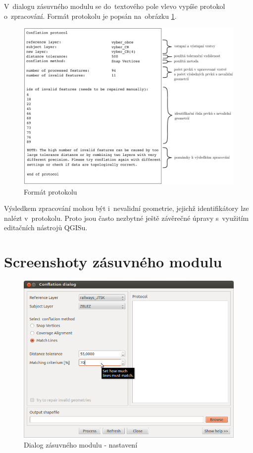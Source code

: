 V~dialogu zásuvného modulu se do~textového pole vlevo vypíše protokol o~zpracování.
Formát protokolu je popsán na~obrázku \ref{fig:protokol}.  

  \begin{figure}[ht]
    \centering
      \includegraphics[width=420pt]{./pictures/protokol.pdf}
      \caption{Formát protokolu}
      \label{fig:protokol}
  \end{figure} 

Výsledkem zpracování mohou být i~nevalidní geometrie, jejichž identifikátory lze
nalézt v~protokolu. Proto jsou často nezbytné ještě závěrečné úpravy s~využitím
editačních nástrojů QGISu.


\chapter{Screenshoty zásuvného modulu}
\label{priloha-screenshoty}

  \begin{figure}[H]
    \centering
      \includegraphics[width=360pt]{./pictures/dialog1.png}
      \caption{Dialog zásuvného modulu - nastavení}
      \label{fig:d1}
  \end{figure} 


